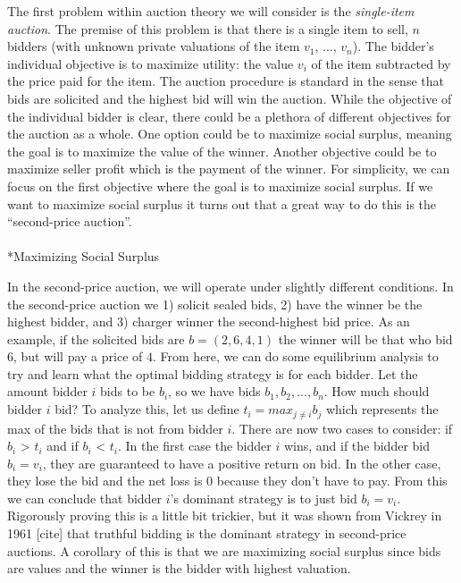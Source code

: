 \documentclass[
  letterpaper,
  numbers=noenddot,
  DIV=11,
  oneside]{scrreprt}
\makeatletter
\let\oldparagraph\paragraph
\renewcommand{\paragraph}{
    \@ifstar
      \xxxParagraphStar
      \xxxParagraphNoStar
  }
\newcommand{\xxxParagraphStar}[1]{\oldparagraph*{#1}\mbox{}}
\newcommand{\xxxParagraphNoStar}[1]{\oldparagraph{#1}\mbox{}}
\theoremstyle{remark}
\makeatother
\begin{document}
The first problem within auction theory we will consider is the
\emph{single-item auction}. The premise of this problem is that there is
a single item to sell, \(n\) bidders (with unknown private valuations of
the item \(v_1\), ..., \(v_n\)). The bidder's individual objective is to
maximize utility: the value \(v_i\) of the item subtracted by the price
paid for the item. The auction procedure is standard in the sense that
bids are solicited and the highest bid will win the auction. While the
objective of the individual bidder is clear, there could be a plethora
of different objectives for the auction as a whole. One option could be
to maximize social surplus, meaning the goal is to maximize the value of
the winner. Another objective could be to maximize seller profit which
is the payment of the winner. For simplicity, we can focus on the first
objective where the goal is to maximize social surplus. If we want to
maximize social surplus it turns out that a great way to do this is the
``second-price auction''.

\paragraph*{Maximizing Social Surplus}\label{maximizing-social-surplus}

In the second-price auction, we will operate under slightly different
conditions. In the second-price auction we 1) solicit sealed bids, 2)
have the winner be the highest bidder, and 3) charger winner the
second-highest bid price. As an example, if the solicited bids are
\(b = (2, 6, 4, 1)\) the winner will be that who bid \(6\), but will pay
a price of \(4\). From here, we can do some equilibrium analysis to try
and learn what the optimal bidding strategy is for each bidder. Let the
amount bidder \(i\) bids to be \(b_i\), so we have bids
\(b_1, b_2, ..., b_n\). How much should bidder \(i\) bid? To analyze
this, let us define \(t_i = max_{j \neq i} b_j\) which represents the
max of the bids that is not from bidder \(i\). There are now two cases
to consider: if \(b_i\) \textgreater{} \(t_i\) and if \(b_i\)
\textless{} \(t_i\). In the first case the bidder \(i\) wins, and if the
bidder bid \(b_i = v_i\), they are guaranteed to have a positive return
on bid. In the other case, they lose the bid and the net loss is 0
because they don't have to pay. From this we can conclude that bidder
\(i\)'s dominant strategy is to just bid \(b_i = v_i\). Rigorously
proving this is a little bit trickier, but it was shown from Vickrey in
1961 {[}cite{]} that truthful bidding is the dominant strategy in
second-price auctions. A corollary of this is that we are maximizing
social surplus since bids are values and the winner is the bidder with
highest valuation.
\end{document}
